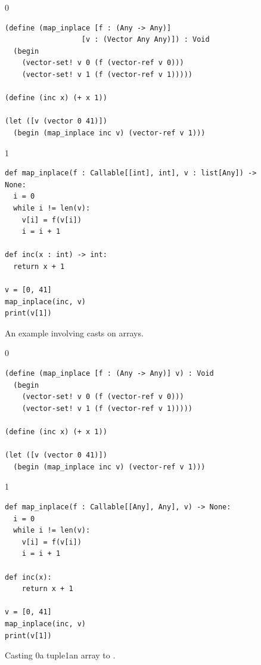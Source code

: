 \documentclass[7x10]{TimesAPriori_MIT}%
\def\racketEd{0}
\def\pythonEd{1}
\providecommand{\BookEdition}{1}
\let\edition\BookEdition
\newcommand{\racket}[1]{{\if\edition\racketEd{#1}\fi}}
\newcommand{\pythonColor}[0]{}
\newcommand{\python}[1]{{\if\edition\pythonEd\pythonColor #1\fi}}
\numberwithin{theorem}{chapter}
\numberwithin{definition}{chapter}
\numberwithin{equation}{chapter}
\begin{document}
\begin{figure}[tbp]
  \begin{tcolorbox}[colback=white]
{\if\edition\racketEd
\begin{lstlisting}
(define (map_inplace [f : (Any -> Any)]
                  [v : (Vector Any Any)]) : Void
  (begin
    (vector-set! v 0 (f (vector-ref v 0)))
    (vector-set! v 1 (f (vector-ref v 1)))))

(define (inc x) (+ x 1))

(let ([v (vector 0 41)])
  (begin (map_inplace inc v) (vector-ref v 1)))
\end{lstlisting}
\fi}
{\if\edition\pythonEd\pythonColor
\begin{lstlisting}
def map_inplace(f : Callable[[int], int], v : list[Any]) -> None:
  i = 0
  while i != len(v):
    v[i] = f(v[i])
    i = i + 1

def inc(x : int) -> int:
  return x + 1

v = [0, 41]
map_inplace(inc, v)
print(v[1])
\end{lstlisting}
\fi}
  \end{tcolorbox}

  \caption{An example involving casts on arrays.}
\label{fig:map-bang}
\end{figure}

\begin{figure}[btp]
  \begin{tcolorbox}[colback=white]
{\if\edition\racketEd
\begin{lstlisting}
(define (map_inplace [f : (Any -> Any)] v) : Void
  (begin
    (vector-set! v 0 (f (vector-ref v 0)))
    (vector-set! v 1 (f (vector-ref v 1)))))

(define (inc x) (+ x 1))

(let ([v (vector 0 41)])
  (begin (map_inplace inc v) (vector-ref v 1)))
\end{lstlisting}
\fi}
{\if\edition\pythonEd\pythonColor
\begin{lstlisting}
def map_inplace(f : Callable[[Any], Any], v) -> None:
  i = 0
  while i != len(v):
    v[i] = f(v[i])
    i = i + 1

def inc(x):
    return x + 1

v = [0, 41]
map_inplace(inc, v)
print(v[1])
\end{lstlisting}
\fi}
  \end{tcolorbox}

  \caption{Casting \racket{a tuple}\python{an array} to \CANYTY{}.}
\label{fig:map-any}
\end{figure}
\end{document}
